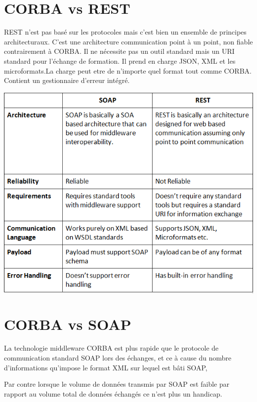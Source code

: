       
      
\section{CORBA vs REST}

REST n'est pas basé sur les protocoles mais c'est bien un ensemble de principes architecturaux. C'est une architecture
communication point à un point, non fiable contrairement à CORBA. Il ne nécessite pas un outil standard mais un URI standard pour l'échange de 
formation. Il prend en charge JSON, XML et les microformats.La charge peut etre de n'importe quel format tout comme CORBA. Contient un 
gestionnaire d'erreur intégré.

\begin{center}
    \includegraphics[scale= 0.7]{chap3/resr.png}
\end{center}


\section{CORBA  vs  SOAP}

La technologie middleware CORBA est plus rapide que le protocole de communication standard SOAP lors des échanges, et ce à cause du nombre d'informations qu'impose le format XML sur lequel est bâti SOAP,

Par contre lorsque le volume de données transmis par SOAP est faible par rapport au volume total de données échangés ce n'est plus un handicap.